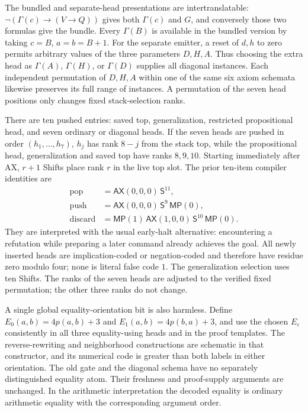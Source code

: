 The bundled and separate-head presentations are intertranslatable:
$\neg(\Gamma(c)\to(V\to Q))$ gives both $\Gamma(c)$ and $G$,
and conversely those two formulas give the bundle.  Every $\Gamma(B)$
is available in the bundled version by taking $c=B$, $a=b=B+1$.
For the separate emitter, a reset of $d,h$ to zero permits arbitrary
values of the three parameters $D,H,A$.  Thus choosing the extra
head as $\Gamma(A)$, $\Gamma(H)$, or $\Gamma(D)$ supplies all diagonal
instances.  Each independent permutation of $D,H,A$ within one of
the same six axiom schemata likewise preserves its full range of
instances.  A permutation of the seven head positions only changes
fixed stack-selection ranks.

There are ten pushed entries: saved top, generalization, restricted
propositional head, and seven ordinary or diagonal heads.
If the seven heads are pushed in order $(h_1,\ldots,h_7)$,
$h_j$ has rank $8-j$ from the stack top, while the propositional head,
generalization and saved top have ranks $8,9,10$.  Starting immediately
after AX, $r+1$ Shifts place rank $r$ in the live top slot.
The prior ten-item compiler identities are
\[
\begin{aligned}
 \mathrm{pop}&=\mathsf{AX}(0,0,0)\,\mathsf S^{11},\\
 \mathrm{push}&=\mathsf{AX}(0,0,0)\,\mathsf S^{9}\,\mathsf{MP}(0),\\
 \mathrm{discard}&=\mathsf{MP}(1)\,\mathsf{AX}(1,0,0)\,
                 \mathsf S^{10}\,\mathsf{MP}(0).
\end{aligned}
\]
They are interpreted with the usual early-halt alternative: encountering
a refutation while preparing a later command already achieves the goal.
All newly inserted heads are implication-coded or negation-coded and
therefore have residue zero modulo four; none is literal false code $1$.
The generalization selection uses ten Shifts.  The ranks of the seven
heads are adjusted to the verified fixed permutation; the other three
ranks do not change.

A single global equality-orientation bit is also harmless.  Define
$E_0(a,b)=4p(a,b)+3$ and $E_1(a,b)=4p(b,a)+3$, and use the chosen
$E_\varepsilon$ consistently in all three equality-using heads and
in the proof templates.  The reverse-rewriting and neighborhood
constructions are schematic in that constructor, and its numerical
code is greater than both labels in either orientation.  The old gate
and the diagonal schema have no separately distinguished equality atom.
Their freshness and proof-supply arguments are unchanged.  In the
arithmetic interpretation the decoded equality is ordinary arithmetic
equality with the corresponding argument order.

